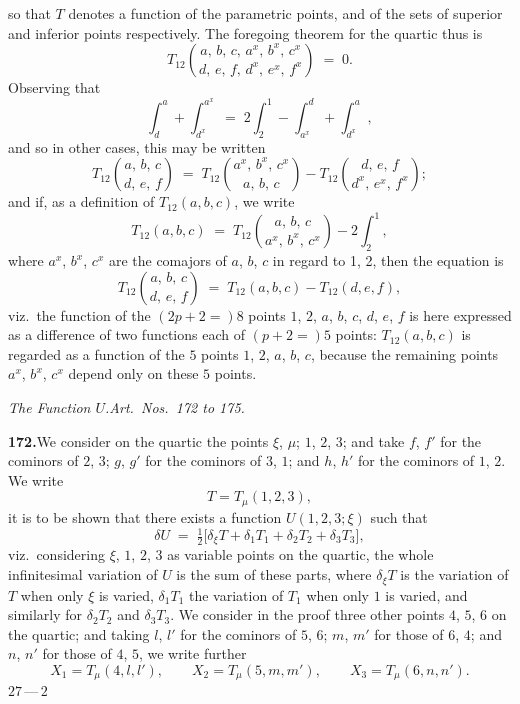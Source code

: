 \documentclass[11pt]{article}
\begin{document}
\noindent
so that $T$ denotes a function of the parametric points, and of the sets of superior
and inferior points respectively.  The foregoing theorem for the quartic thus is
\[
T_{12}\binom{a,\,b,\,c,\,a^{x},\,b^{x},\,c^{x}}{d,\,e,\,f,\,d^{x},\,e^{x},\,f^{x}} \;=\; 0.
\]
Observing that
\[
\int_{d}^{a}+\int_{d^{x}}^{a^{x}} \;=\; 2\!\int_{2}^{1}-\int_{a^{x}}^{d}+\int_{d^{x}}^{a},
\]
and so in other cases, this may be written
\[
T_{12}\binom{a,\,b,\,c}{d,\,e,\,f} \;=\; T_{12}\binom{a^{x},\,b^{x},\,c^{x}}{a,\,b,\,c}-T_{12}\binom{d,\,e,\,f}{d^{x},\,e^{x},\,f^{x}};
\]
and if, as a definition of $T_{12}(a,b,c)$, we write
\[
T_{12}(a,b,c) \;=\; T_{12}\binom{a,\,b,\,c}{a^{x},\,b^{x},\,c^{x}} - 2\!\int_{2}^{1},
\]
where $a^{x}$, $b^{x}$, $c^{x}$ are the comajors of $a$, $b$, $c$ in regard to 1, 2, then the equation is
\[
T_{12}\binom{a,\,b,\,c}{d,\,e,\,f} \;=\; T_{12}(a,b,c)-T_{12}(d,e,f),
\]
viz.\ the function of the $(2p+2=)8$ points $1$, $2$, $a$, $b$, $c$, $d$, $e$, $f$ is here expressed as
a difference of two functions each of $(p+2=)5$ points: $T_{12}(a,b,c)$ is regarded as a
function of the $5$ points $1$, $2$, $a$, $b$, $c$, because the remaining points $a^{x}$, $b^{x}$, $c^{x}$ depend
only on these $5$ points.

\bigskip
\begin{center}\textit{The Function $U$.\quad Art.\ Nos.\ 172 to 175.}\end{center}

\textbf{172.}\quad We consider on the quartic the points $\xi$, $\mu$; $1$, $2$, $3$; and take $f$, $f'$ for
the cominors of $2$, $3$; $g$, $g'$ for the cominors of $3$, $1$; and $h$, $h'$ for the cominors of
$1$, $2$.  We write
\[
T = T_{\mu}(1,2,3),
\]
it is to be shown that there exists a function $U(1,2,3;\xi)$ such that
\[
\delta U \;=\; \tfrac{1}{2}\bigl[\delta_{\xi}T + \delta_{1}T_{1} + \delta_{2}T_{2} + \delta_{3}T_{3}\bigr],
\]
viz.\ considering $\xi$, $1$, $2$, $3$ as variable points on the quartic, the whole infinitesimal
variation of $U$ is the sum of these parts, where $\delta_{\xi}T$ is the variation of $T$ when only
$\xi$ is varied, $\delta_{1}T_{1}$ the variation of $T_{1}$ when only $1$ is varied, and similarly for $\delta_{2}T_{2}$
and $\delta_{3}T_{3}$.  We consider in the proof three other points $4$, $5$, $6$ on the quartic; and
taking $l$, $l'$ for the cominors of $5$, $6$; $m$, $m'$ for those of $6$, $4$; and $n$, $n'$ for those
of $4$, $5$, we write further
\[
X_{1} = T_{\mu}(4,l,l'),\qquad X_{2} = T_{\mu}(5,m,m'),\qquad X_{3} = T_{\mu}(6,n,n').
\]
\smallskip
\hfill $27\,$---$\,2$
\end{document}
